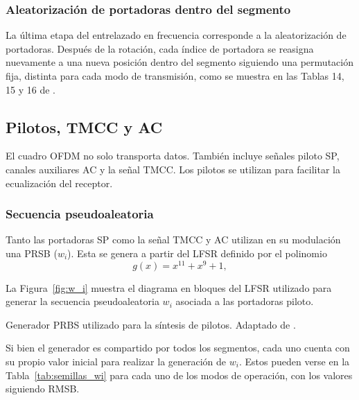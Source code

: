 \subsubsection{Aleatorización de portadoras dentro del segmento}

La última etapa del entrelazado en frecuencia corresponde a la aleatorización de portadoras. Después de la rotación, cada índice de portadora se reasigna nuevamente a una nueva posición dentro del segmento siguiendo una permutación fija, distinta para cada modo de transmisión, como se muestra en las Tablas 14, 15 y 16 de \cite{abnt}.

\subsection{Pilotos, TMCC y AC}

El cuadro OFDM no solo transporta datos. También incluye señales piloto SP, canales auxiliares AC y la señal TMCC. Los pilotos se utilizan para facilitar la ecualización del receptor.

\subsubsection{Secuencia pseudoaleatoria}
Tanto las portadoras SP como la señal TMCC y AC utilizan en su modulación una PRSB ($w_i$). Esta se genera a partir del LFSR definido por el polinomio
\begin{equation}
g(x)=x^{11}+x^9+1,
\end{equation}

La Figura~\ref{fig:w_i} muestra el diagrama en bloques del LFSR utilizado para generar la secuencia pseudoaleatoria $w_i$ asociada a las portadoras piloto.

{Generador PRBS utilizado para la síntesis de pilotos.}
{Adaptado de \cite{isdbt}.}
{\label{fig:w_i}}

Si bien el generador es compartido por todos los segmentos, cada uno cuenta con su propio valor inicial para realizar la generación de $w_i$. Estos pueden verse en la Tabla~\ref{tab:semillas_wi} para cada uno de los modos de operación, con los valores siguiendo RMSB.


